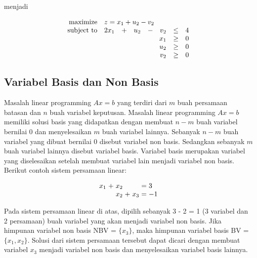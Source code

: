 \begin{enumerate}
		menjadi
		
		\begin{equation*}
			\begin{array}{r r c r c r c l}
				\text{maximize} & \multicolumn{7}{l}{z = x_1 + u_2 - v_2}\\
				\text{subject to} & 2x_1 & + & u_2 & - & v_2 & \leq & 4\\
									& \multicolumn{5}{r}{x_1} & \geq & 0\\
									& \multicolumn{5}{r}{u_2} & \geq & 0\\
									& \multicolumn{5}{r}{v_2} & \geq & 0\\
			\end{array}
		\end{equation*}
\end{enumerate}

\subsection{Variabel Basis dan Non Basis}
\label{variabel_basis_dan_non_basis}

Masalah linear programming \(Ax = b\) yang terdiri dari \(m\) buah persamaan batasan dan \(n\) buah variabel keputusan. Masalah linear programming \(Ax = b\) memiliki solusi basis yang didapatkan dengan membuat \(n - m\) buah variabel bernilai 0 dan menyelesaikan \(m\) buah variabel lainnya. Sebanyak \(n - m\) buah variabel yang dibuat bernilai 0 disebut variabel non basis. Sedangkan sebanyak \(m\) buah variabel lainnya disebut variabel basis. Variabel basis merupakan variabel yang diselesaikan setelah membuat variabel lain menjadi variabel non basis. Berikut contoh sistem persamaan linear:

\begin{equation*}
	\setlength\arraycolsep{1.5pt}
	\begin{array}{r c r c r c l}
		x_1 &+ &x_2 &  &    &= &3\\
		    &  &x_2 &+ &x_3 &= &-1
	\end{array}
\end{equation*}

Pada sistem persamaan linear di atas, dipilih sebanyak 3 - 2 = 1 (3 variabel dan 2 persamaan) buah variabel yang akan menjadi variabel non basis. Jika himpunan variabel non basis NBV = \(\{x_3\}\), maka himpunan variabel basis BV = \(\{x_1, x_2\}\). Solusi dari sistem persamaan tersebut dapat dicari dengan membuat variabel \(x_3\) menjadi variabel non basis dan menyelesaikan variabel basis lainnya.

